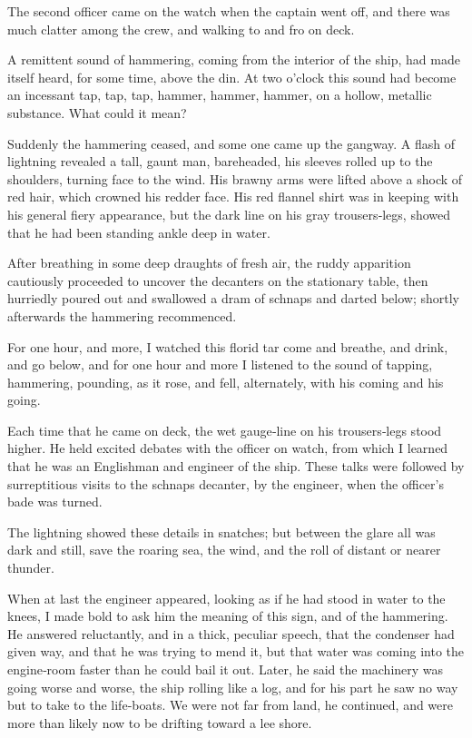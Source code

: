 \documentclass[12pt]{book}
\begin{document}
The second officer came on the watch when the captain went off, and there
was much clatter among the crew, and walking to and fro on deck.

A remittent sound of hammering, coming from the interior of the ship, had
made itself heard, for some time, above the din. At two o’clock this sound had
become an incessant tap, tap, tap, hammer, hammer, hammer, on a hollow, metallic
substance. What could it mean?

Suddenly the hammering ceased, and some one came up the gangway. A flash
of lightning revealed a tall, gaunt man, bareheaded, his sleeves rolled up to the
shoulders, turning face to the wind. His brawny arms were lifted above a shock of
red hair, which crowned his redder face. His red flannel shirt was in keeping with
his general fiery appearance, but the dark line on his gray trousers‐legs, showed
that he had been standing ankle deep in water.

After breathing in some deep draughts of fresh air, the ruddy apparition
cautiously proceeded to uncover the decanters on the stationary table, then
hurriedly poured out and swallowed a dram of schnaps and darted below; shortly
afterwards the hammering recommenced.

For one hour, and more, I watched this florid tar come and breathe, and drink,
and go below, and for one hour and more I listened to the sound of tapping,
hammering, pounding, as it rose, and fell, alternately, with his coming and his
going.

Each time that he came on deck, the wet gauge‐line on his trousers‐legs stood
higher. He held excited debates with the officer on watch, from which I learned
that he was an Englishman and engineer of the ship. These talks were followed
by surreptitious visits to the schnaps decanter, by the engineer, when the officer’s
bade was turned.

The lightning showed these details in snatches; but between the glare all was
dark and still, save the roaring sea, the wind, and the roll of distant or nearer
thunder.

When at last the engineer appeared, looking as if he had stood in water to the
knees, I made bold to ask him the meaning of this sign, and of the hammering.
He answered reluctantly, and in a thick, peculiar speech, that the condenser had
given way, and that he was trying to mend it, but that water was coming into the
engine‐room faster than he could bail it out. Later, he said the machinery was
going worse and worse, the ship rolling like a log, and for his part he saw no way
but to take to the life‐boats. We were not far from land, he continued, and were
more than likely now to be drifting toward a lee shore.
\end{document}
